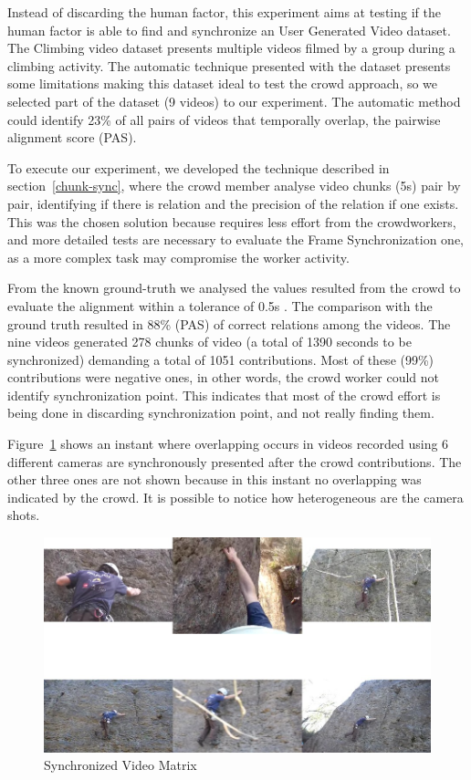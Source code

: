 Instead of discarding the human factor, this experiment aims at testing if the human factor is able to find and synchronize an User Generated Video dataset. The Climbing video dataset \cite{hal-01162603} presents multiple videos filmed by a group during a climbing activity. The automatic technique presented with the dataset presents some limitations making this dataset ideal to test the crowd approach, so we selected part of the dataset (9 videos) to our experiment. The automatic method could identify 23\% of all pairs of videos that temporally overlap, the pairwise alignment score (PAS).

To execute our experiment, we developed the technique described in section~\ref{chunk-sync}, where the crowd member analyse video chunks (5s) pair by pair, identifying if there is relation and the precision of the relation if one exists. This was the chosen solution because requires less effort from the crowdworkers, and more detailed tests are necessary to evaluate the Frame Synchronization one, as a more complex task may compromise the worker activity.

From the known ground-truth we analysed the values resulted from the crowd to evaluate the alignment within a tolerance of 0.5s \cite{hal-01162603}. The comparison with the ground truth resulted in 88\% (PAS) of correct relations among the videos. The nine videos generated 278 chunks of video (a total of 1390 seconds to be synchronized) demanding a total of 1051 contributions. Most of these (99\%) contributions were negative ones, in other words, the crowd worker could not identify synchronization  point. This indicates that most of the crowd effort is being done in discarding synchronization point, and not really finding them.

Figure~\ref{interface} shows an instant where overlapping occurs in videos recorded using 6 different cameras are synchronously presented after the crowd contributions. The other three ones are not shown because in this instant no overlapping was indicated by the crowd. It is possible to notice how heterogeneous are the camera shots. 

\begin{figure}[h]
	\centerline{\includegraphics[scale=0.2] {figure/matrix}}
	\caption{Synchronized Video Matrix}
	\label{interface}
\end{figure}